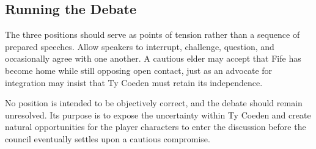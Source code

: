 \subsection*{Running the Debate}
{\entryfont The three positions should serve as points of tension rather than a sequence of prepared speeches. Allow speakers to interrupt, challenge, question, and occasionally agree with one another. A cautious elder may accept that Fife has become home while still opposing open contact, just as an advocate for integration may insist that Ty Coeden must retain its independence.

No position is intended to be objectively correct, and the debate should remain unresolved. Its purpose is to expose the uncertainty within Ty Coeden and create natural opportunities for the player characters to enter the discussion before the council eventually settles upon a cautious compromise.}
\eject